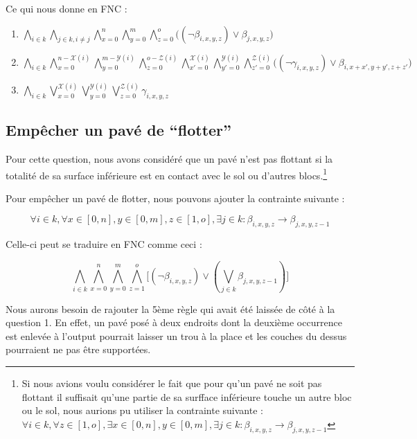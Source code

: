 \documentclass[a4paper]{article}
\begin{document}
Ce qui nous donne en FNC :

\begin{enumerate}
  \item $
  \bigwedge_{i \in k} \bigwedge_{j \in k, i \neq j}
  \bigwedge_{x=0}^{n} \bigwedge_{y=0}^{m} \bigwedge_{z=0}^{o}
  \Big( (\lnot \beta_{i, x, y, z}) \lor \beta_{j, x, y, z} \Big)
  $

  \item $
  \bigwedge_{i \in k}
  \bigwedge_{x=0}^{n - \mathcal{X}(i)} \bigwedge_{y=0}^{m - \mathcal{Y}(i)} \bigwedge_{z=0}^{o - \mathcal{Z}(i)}
  \bigwedge_{x'=0}^{\mathcal{X}(i)} \bigwedge_{y'=0}^{\mathcal{Y}(i)} \bigwedge_{z'=0}^{\mathcal{Z}(i)}
  \Big( (\lnot \gamma_{i, x, y, z}) \lor \beta_{i, x+x', y+y', z+z'} \Big)
  $

  \item $
  \bigwedge_{i \in k}
  \bigvee_{x=0}^{\mathcal{X}(i)} \bigvee_{y=0}^{\mathcal{Y}(i)} \bigvee_{z=0}^{\mathcal{Z}(i)}
  \gamma_{i, x, y, z}
  $
\end{enumerate}

\subsection{Empêcher un pavé de ``flotter''}

Pour cette question, nous avons considéré que un pavé n'est pas flottant si la totalité de sa surface inférieure est en contact avec le sol ou d'autres blocs.\footnote{Si nous avions voulu considérer le fait que pour qu'un pavé ne soit pas flottant il suffisait qu'une partie de sa surfface inférieure touche un autre bloc ou le sol, nous aurions pu utiliser la contrainte suivante : $
\forall i \in k, \forall z \in [1, o], \exists x \in [0, n], y \in [0, m],
\exists j \in k : \beta_{i, x, y, z} \rightarrow \beta_{j, x, y, z-1}
$}

Pour empêcher un pavé de flotter, nous pouvons ajouter la contrainte suivante :

$$
\forall i \in k, \forall x \in [0, n], y \in [0, m], z \in [1, o],
\exists j \in k : \beta_{i, x, y, z} \rightarrow \beta_{j, x, y, z-1}
$$

Celle-ci peut se traduire en FNC comme ceci :

$$
\bigwedge_{i \in k}
  \bigwedge_{x=0}^{n} \bigwedge_{y=0}^{m} \bigwedge_{z=1}^{o}
  \Big[
  (\lnot \beta_{i, x, y, z}) \lor (\bigvee_{j \in k} \beta_{j, x, y, z-1})
  \Big]
$$

Nous aurons besoin de rajouter la 5ème règle qui avait été laissée de côté à la question 1. En effet, un pavé posé à deux endroits dont la deuxième occurrence est enlevée à l'output pourrait laisser un trou à la place et les couches du dessus pourraient ne pas être supportées.
\end{document}
